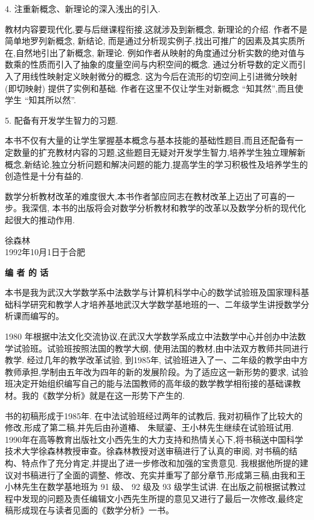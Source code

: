 4. 注重新概念、新理论的深入浅出的引入.

教材内容要现代化,要与后继课程衔接,这就涉及到新概念, 新理论的介绍. 作者不是简单地罗列新概念, 新结论, 而是通过分析现实例子,找出可推广的因素及其实质所在,自然地引出了新概念, 新理论. 例如作者从映射的角度通过分析实数的绝对值与数乘的性质而引入了抽象的度量空间与内积空间的概念. 通过分析导数的定义而引入了用线性映射定义映射微分的概念. 这为今后在流形的切空间上引进微分映射 (即切映射) 提供了实例和基础. 作者在这里不仅让学生对新概念 “知其然”,而且使学生 “知其所以然”.

5. 配备有开发学生智力的习题.

本书不仅有大量的让学生掌握基本概念与基本技能的基础性题目,而且还配备有一定数量的扩充教材内容的习题,这些题目无疑对开发学生智力,培养学生独立理解新概念,新结论,独立分析问题和解决问题的能力,提高学生的学习积极性及培养学生的创造性是十分有益的.

数学分析教材改革的难度很大,本书作者邹应同志在教材改革上迈出了可喜的一步。我深信, 本书的出版将会对数学分析教材和教学的改革以及数学分析的现代化起很大的推动作用.
\begin{flushright}
	徐森林\\
	1992年10月1日于合肥
\end{flushright}

\newpage
\begin{center}
	\textbf{\heiti \large 编 者 的 话}
\end{center}

本书是我为武汉大学数学系中法数学与计算机科学中心的数学试验班及国家理科基础科学研究和教学人才培养基地武汉大学数学基地班的一、二年级学生讲授数学分析课而编写的。

1980 年根据中法文化交流协议,在武汉大学数学系成立中法数学中心并创办中法数学试验班。试验班按照法国的教学大纲, 使用法国的教材,由中法双方教师共同进行教学. 经过几年的教学改革试验, 到1985年, 试验班进入了一、二年级的教学由中方教师承担,学制由五年改为四年的新的发展阶段。为了适应这一新形势的要求, 试验班决定开始组织编写自己的能与法国教师的高年级的数学教学相衔接的基础课教材。我的《数学分析》就是在这一形势下产生的.

书的初稿形成于1985年. 在中法试验班经过两年的试教后, 我对初稿作了比较大的修改,形成了第二稿,并先后由孙道椿、 朱赋鎏、王小林先生继续在试验班试用. 1990年在高等教育出版社文小西先生的大力支持和热情关心下,将书稿送中国科学技术大学徐森林教授审查。徐森林教授对送审稿进行了认真的审阅, 对书稿的结构、特点作了充分肯定,并提出了进一步修改和加强的宝贵意见. 我根据他所提的建议对书稿进行了全面的调整、修改、充实并重写了部分章节,形成第三稿,由我和王小林先生在数学基地班为 91 级、 92 级及 93 级学生试讲. 在出版之前根据试教过程中发现的问题及责任编辑文小西先生所提的意见又进行了最后一次修改,最终定稿形成现在与读者见面的《数学分析》一书。

